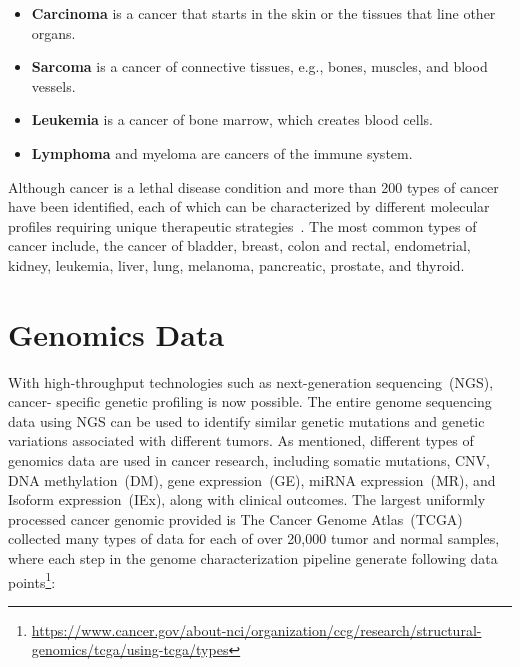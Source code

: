 \begin{itemize}[noitemsep]
    \item \textbf{Carcinoma} is a cancer that starts in the skin or the tissues that line other organs.
    \item \textbf{Sarcoma} is a cancer of connective tissues, e.g., bones, muscles, and blood vessels.
    \item \textbf{Leukemia} is a cancer of bone marrow, which creates blood cells.
    \item \textbf{Lymphoma} and myeloma are cancers of the immune system.
\end{itemize} 

\hspace*{3.5mm} Although cancer is a lethal disease condition and more than 200 types of cancer have been identified, each of which can be characterized by different molecular profiles requiring unique therapeutic strategies~\cite{82Tomczak}. The most common types of cancer include, the cancer of bladder, breast, colon and rectal, endometrial, kidney, leukemia, liver, lung, melanoma, pancreatic, prostate, and thyroid. 

\section{Genomics Data}
With high-throughput technologies such as next-generation sequencing~(NGS), cancer-
specific genetic profiling is now possible. The entire genome sequencing data using NGS can be used to identify similar genetic mutations and genetic variations associated with different tumors. %
As mentioned, different types of genomics data are used in cancer research, including somatic mutations, CNV, DNA methylation~(DM), gene expression~(GE), miRNA expression~(MR), and Isoform expression~(IEx), along with clinical outcomes. The largest uniformly processed cancer genomic provided is The Cancer Genome Atlas~(TCGA) collected many types of data for each of over 20,000 tumor and normal samples, where each step in the genome characterization pipeline generate following data points\footnote{\url{https://www.cancer.gov/about-nci/organization/ccg/research/structural-genomics/tcga/using-tcga/types}}:

